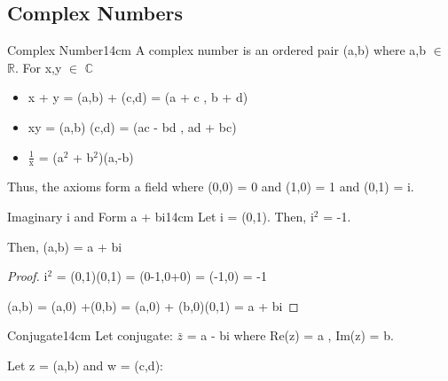 \subsection{ Complex Numbers }

	\begin{definition}{Complex Number}{14cm}
		A complex number is an ordered pair (a,b) where a,b $\in$ $ \mathbb{R} $.
		For x,y $\in$ $\mathbb{C}$

		\begin{itemize}[leftmargin=2cm, itemsep=0.1cm]
			\item x + y = (a,b) + (c,d) = (a + c , b + d)
			\item xy = (a,b) (c,d) = (ac - bd , ad + bc)
			\item $\frac{1}{\text{x}}$  = (a$^2$ + b$^2$)(a,-b)
		\end{itemize}

		Thus, the axioms form a field where (0,0) = 0 and (1,0) = 1 and (0,1) = i.
	\end{definition}

	\vspace{0.5cm}



	\begin{wtheorem}{Imaginary i and Form a + bi}{14cm}
		Let i = (0,1). Then, i$^2$ = -1.

		Then, (a,b) = a + bi
	\end{wtheorem}

	\begin{proof}
		i$^\text{2}$ = (0,1)(0,1) = (0-1,0+0) = (-1,0) = -1

		(a,b) = (a,0) +(0,b) = (a,0) + (b,0)(0,1) = a + bi
	\end{proof}
	
	\newpage



	\begin{definition}{Conjugate}{14cm}
		Let conjugate: $\bar{z}$ = a - bi where Re(z) = a , Im(z) = b.

		Let z = (a,b) and w = (c,d):
	\end{definition}

